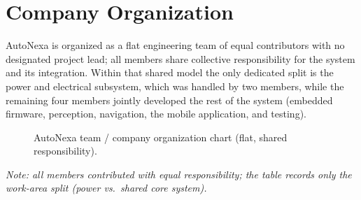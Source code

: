 \documentclass[12pt,a4paper]{report}
\newcommand{\pname}{AutoNexa}
\begin{document}
\tableofcontents
\clearpage
\listoffigures
\clearpage
\listoftables
\clearpage

\chapter*{Company Organization}

\pname{} is organized as a flat engineering team of equal contributors with no
designated project lead; all members share collective responsibility for the
system and its integration. Within that shared model the only dedicated split is
the power and electrical subsystem, which was handled by two members, while the
remaining four members jointly developed the rest of the system (embedded
firmware, perception, navigation, the mobile application, and testing).

\begin{figure}[H]
\centering
{}
\caption{\pname{} team / company organization chart (flat, shared responsibility).}
\label{fig:org}
\end{figure}

\noindent\textit{Note: all members contributed with equal responsibility; the
table records only the work-area split (power vs.\ shared core system).}
\end{document}
